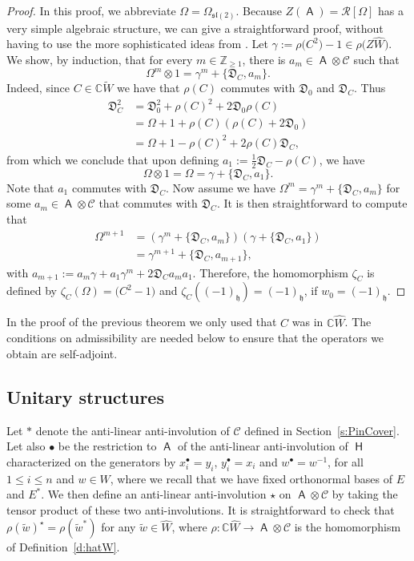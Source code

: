 \documentclass[10pt,a4paper]{amsart}
\numberwithin{equation}{section}
\newcommand{\fh}{\mathfrak{h}}
\newcommand{\fl}{\mathfrak{l}}
\newcommand{\fs}{\mathfrak{s}}
\newcommand{\bbc}{\mathbb{C}}
\newcommand{\Cc}{\mathcal{C}}
\DeclareMathOperator{\rca}{\mathsf{H}}
\DeclareMathOperator{\ama}{\mathsf{A}}
\begin{document}
\begin{proof}
In this proof, we abbreviate $\Omega = \Omega_{\fs\fl(2)}$.
Because $Z(\ama) = \mathcal{R}[\Omega]$ has a very simple algebraic structure, we can give a straightforward proof, without having to use the more sophisticated ideas from \cite{HP02}. Let $\gamma := \rho\big(C^2\big) - 1\in \rho\big(Z\hat{W}\big)$. We show, by induction, that for every $m\in\mathbb{Z}_{\geq 1}$, there is $a_m \in \ama \otimes \Cc$ such that
\[
\Omega^m\otimes 1 = \gamma^m + \{\mathfrak{D}_C,a_m\}.
\]
Indeed, since $C\in \bbc\tilde W$ we have that $\rho(C)$ commutes with $\mathfrak{D}_0$ and $\mathfrak{D}_C$. Thus
\begin{align*}
 \mathfrak{D}_C^2 &= \mathfrak{D}_0^2 + \rho(C)^2 + 2\mathfrak{D}_0\rho(C)\\
 &= \Omega + 1 + \rho(C)(\rho(C) + 2\mathfrak{D}_0)\\
 &= \Omega + 1 - \rho(C)^2 + 2\rho(C)\mathfrak{D}_C,
\end{align*}
from which we conclude that upon defining $a_1 := \tfrac{1}{2}\mathfrak{D}_C-\rho(C)$, we have
\[
\Omega\otimes 1 = \Omega = \gamma + \{\mathfrak{D}_C,a_1\}.
\]
Note that $a_1$ commutes with $\mathfrak{D}_C$.
Now assume we have $\Omega^m = \gamma^m + \{\mathfrak{D}_C,a_m\}$ for some $a_m\in \ama \otimes \Cc$ that commutes with $\mathfrak{D}_C$. It is then straightforward to compute that
\begin{align*}
 \Omega^{m+1} &= (\gamma^m + \{\mathfrak{D}_C,a_m\})(\gamma + \{\mathfrak{D}_C,a_1\})\\
 &=\gamma^{m+1} + \{\mathfrak{D}_C,a_{m+1}\},
\end{align*}
with $a_{m+1} := a_m\gamma + a_1\gamma^m + 2\mathfrak{D}_Ca_ma_1$. Therefore, the homomorphism $\zeta_C$ is defined by $\zeta_C(\Omega) = \big(C^2 -1\big)$ and $\zeta_C((-1)_\fh) = (-1)_\fh$, if $w_0 = (-1)_\fh$.
\end{proof}

\begin{Remark}
In the proof of the previous theorem we only used that $C$ was in $\bbc\hat{W}$. The conditions on admissibility are needed below to ensure that the operators we obtain are self-adjoint.
\end{Remark}

\subsection{Unitary structures}
Let $\ast$ denote the anti-linear anti-involution of $\Cc$ defined in Section~\ref{s:PinCover}. Let also $\bullet$ be the restriction to $\ama$ of the anti-linear anti-involution of $\rca$ characterized on the generators by $x_i^\bullet = y_i$, $y_i^\bullet = x_i$ and $w^\bullet = w^{-1}$, for all $1\leq i \leq n$ and $w\in W$, where we recall that we have fixed orthonormal bases of $E$ and $E^*$. We then define an anti-linear anti-involution $\star$ on $\ama\otimes\Cc$ by taking the tensor product of these two anti-involutions. It is straightforward to check that $\rho(\tilde{w})^\star = \rho(\tilde{w}^*)$ for any $\tilde{w}\in\hat{W}$, where $\rho\colon \bbc\hat{W}\to\ama\otimes\Cc$ is the homomorphism of Definition~\ref{d:hatW}.
\end{document}
